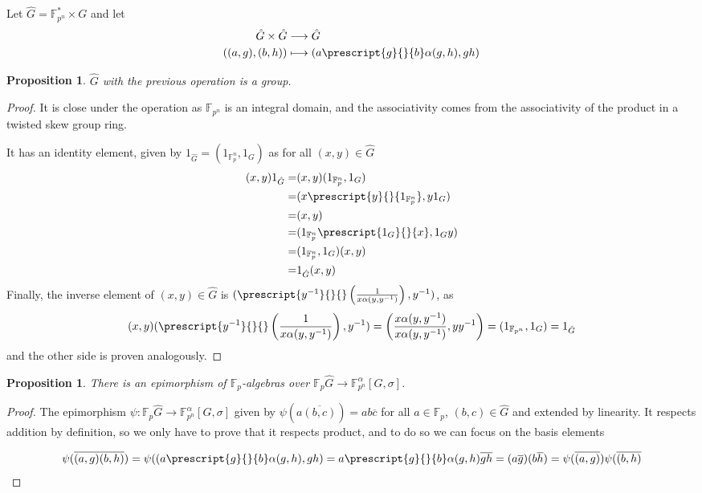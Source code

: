 \documentclass{article}
\newtheorem{proposition}[theorem]{Proposition}
\begin{document}
Let $\hat{G}= \mathbb{F}_{p^n}^* \times G$ and let 
\begin{align*}
    \hat{G} \times \hat{G} & \longrightarrow \hat{G} \\
    ((a,g),(b,h)) & \longmapsto (a \prescript{g}{}{b} \alpha(g,h) , gh)
\end{align*}

\begin{proposition} \label{hatGisgroup}
    $\hat{G}$ with the previous operation is a group. 
\end{proposition}
\begin{proof}
    It is close under the operation as $\mathbb{F}_{p^n}$ is an integral domain, and the associativity comes from the associativity of the product in a twisted skew group ring. 

    It has an identity element, given by $1_{\hat{G}} = (1_{\mathbb{F}_p^n}, 1_G)$ as for all $(x,y) \in \hat{G}$
    \begin{align*}
        (x,y) 1_{\hat{G}} = &  (x,y) (1_{\mathbb{F}_p^n}, 1_G) \\ = & (x \prescript{y}{}{1_{\mathbb{F}_p^n}}, y 1_G )  \\ = & (x,y)  \\ = & (  1_{\mathbb{F}_p^n}\prescript{1_G}{}{x},  1_G y)  \\ = & (1_{\mathbb{F}_p^n}, 1_G)  (x,y)  \\ = & 1_{\hat{G}} (x,y)
    \end{align*}
    Finally, the inverse element of $(x,y) \in \hat{G}$ is $(\prescript{y^{-1}}{}{} \left(\frac{1}{x\alpha(y,y^{-1})}\right),y^{-1})$, as 
    \begin{equation}
        (x,y)  (\prescript{y^{-1}}{}{} \left(\frac{1}{x\alpha(y,y^{-1})}\right),y^{-1}) = \left( \frac{x\alpha(y,y^{-1})}{x\alpha(y,y^{-1})} , y y^{-1}\right) = (1_{\mathbb{F}_{p^n}},1_G) = 1_{\hat{G}}
    \end{equation}
    and the other side is proven analogously.
\end{proof}
\begin{proposition}
    There is an epimorphism of $\mathbb{F}_p$-algebras over  $\mathbb{F}_p \hat{G} \longrightarrow \mathbb{F}_{p^n}^\alpha[G,\sigma]$.
\end{proposition}
\begin{proof}
The epimorphism $\psi :\mathbb{F}_p \hat{G}  \longrightarrow \mathbb{F}_{p^n}^\alpha[G,\sigma]$ given by $\psi(a \overline{(b,c)}) = ab \overline{c}$ for all $a\in \mathbb{F}_p$, $(b,c) \in \hat{G}$ and extended by linearity. It respects addition by definition, so we only have to prove that it respects product, and to do so we can focus on the basis elements

\begin{equation}
    \psi(\overline{(a,g)} \overline{(b,h)} ) = \psi(  (a \prescript{g}{}{b} \alpha(g,h) , gh) = a \prescript{g}{}{b} \alpha(g,h) \overline{gh} = ( a\overline{g} ) ( b \overline{h} ) = \psi(\overline{(a,g)}) \psi ( \overline{(b,h)}
\end{equation}
\end{proof}
\end{document}
